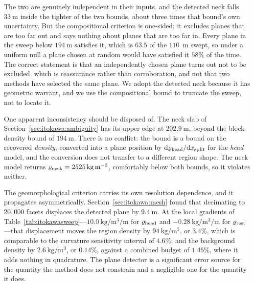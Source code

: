 The two are genuinely independent in their inputs, and the detected neck
falls $\SI{33}{\metre}$ inside the tighter of the two bounds, about three
times that bound's own uncertainty. But the compositional criterion is
one-sided: it excludes planes that are too far out and says nothing about
planes that are too far in. Every plane in the sweep below
$\SI{194}{\metre}$ satisfies it, which is $63.5$ of the $110$~m swept, so
under a uniform null a plane chosen at random would have satisfied it $58\%$
of the time. The correct statement is that an independently chosen plane
turns out not to be excluded, which is reassurance rather than corroboration,
and not that two methods have selected the same plane. We adopt the detected
neck because it has geometric warrant, and we use the compositional bound to
truncate the sweep, not to locate it.

One apparent inconsistency should be disposed of. The neck slab of
Section~\ref{sec:itokawa:ambiguity} has its upper edge at
$\SI{202.9}{\metre}$, beyond the block-density bound of
$\SI{194}{\metre}$. There is no conflict: the bound is a bound on the
recovered \emph{density}, converted into a plane position by
$\mathrm{d}\varrho_{\mathrm{head}}/\mathrm{d}x_{\mathrm{split}}$ for the \emph{head} model, and the
conversion does not transfer to a different region shape. The neck model
returns $\varrho_{\mathrm{neck}} = \SI{2525}{\kilo\gram\per\cubic\metre}$, comfortably
below both bounds, so it violates neither.

The geomorphological criterion carries its own resolution dependence, and it
propagates asymmetrically. Section~\ref{sec:itokawa:mesh} found that
decimating to $20{,}000$ facets displaces the detected plane by
$\SI{9.4}{\metre}$. At the local gradients of
Table~\ref{tab:itokawasweep}---$\SI{10.0}{\kilo\gram\per\cubic\metre\per
\metre}$ for $\varrho_{\mathrm{head}}$ and
$-\SI{0.28}{\kilo\gram\per\cubic\metre\per\metre}$ for $\varrho_{\mathrm{rest}}$---that
displacement moves the region density by $\SI{94}{\kilo\gram\per
\cubic\metre}$, or $3.4\%$, which is comparable to the curvature sensitivity
interval of $4.6\%$; and the background density by
$\SI{2.6}{\kilo\gram\per\cubic\metre}$, or $0.14\%$, against a combined
budget of $1.45\%$, where it adds nothing in quadrature. The plane detector
is a significant error source for the quantity the method does not constrain
and a negligible one for the quantity it does.


